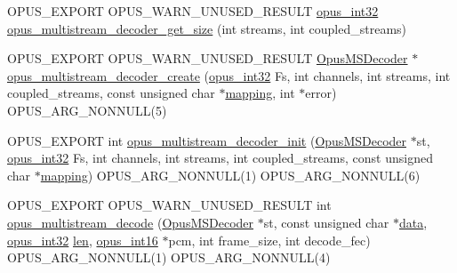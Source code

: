 \begin{DoxyCompactItemize}
\item 
O\+P\+U\+S\+\_\+\+E\+X\+P\+O\+RT O\+P\+U\+S\+\_\+\+W\+A\+R\+N\+\_\+\+U\+N\+U\+S\+E\+D\+\_\+\+R\+E\+S\+U\+LT \mbox{\hyperlink{opus__types_8h_aa4d309d6f80b99dbabebc8f98879ab9a}{opus\+\_\+int32}} \mbox{\hyperlink{group__opus__multistream_gad4e534e2ee78039fff01cd0c6f7c1dd1}{opus\+\_\+multistream\+\_\+decoder\+\_\+get\+\_\+size}} (int streams, int coupled\+\_\+streams)
\item 
O\+P\+U\+S\+\_\+\+E\+X\+P\+O\+RT O\+P\+U\+S\+\_\+\+W\+A\+R\+N\+\_\+\+U\+N\+U\+S\+E\+D\+\_\+\+R\+E\+S\+U\+LT \mbox{\hyperlink{group__opus__multistream_gad3497495deb9a8ace82e76cd4f93e0e4}{Opus\+M\+S\+Decoder}} $\ast$ \mbox{\hyperlink{group__opus__multistream_ga0dc5378a3d4c65498cf530e450b56aa1}{opus\+\_\+multistream\+\_\+decoder\+\_\+create}} (\mbox{\hyperlink{opus__types_8h_aa4d309d6f80b99dbabebc8f98879ab9a}{opus\+\_\+int32}} Fs, int channels, int streams, int coupled\+\_\+streams, const unsigned char $\ast$\mbox{\hyperlink{_s_d_l__opengl__glext_8h_aa4f194e5160ccbb5a8e83ab6ef4676d2}{mapping}}, int $\ast$error) O\+P\+U\+S\+\_\+\+A\+R\+G\+\_\+\+N\+O\+N\+N\+U\+LL(5)
\item 
O\+P\+U\+S\+\_\+\+E\+X\+P\+O\+RT int \mbox{\hyperlink{group__opus__multistream_gac9680d4205a5ea95785e747f0d2e393b}{opus\+\_\+multistream\+\_\+decoder\+\_\+init}} (\mbox{\hyperlink{group__opus__multistream_gad3497495deb9a8ace82e76cd4f93e0e4}{Opus\+M\+S\+Decoder}} $\ast$st, \mbox{\hyperlink{opus__types_8h_aa4d309d6f80b99dbabebc8f98879ab9a}{opus\+\_\+int32}} Fs, int channels, int streams, int coupled\+\_\+streams, const unsigned char $\ast$\mbox{\hyperlink{_s_d_l__opengl__glext_8h_aa4f194e5160ccbb5a8e83ab6ef4676d2}{mapping}}) O\+P\+U\+S\+\_\+\+A\+R\+G\+\_\+\+N\+O\+N\+N\+U\+LL(1) O\+P\+U\+S\+\_\+\+A\+R\+G\+\_\+\+N\+O\+N\+N\+U\+LL(6)
\item 
O\+P\+U\+S\+\_\+\+E\+X\+P\+O\+RT O\+P\+U\+S\+\_\+\+W\+A\+R\+N\+\_\+\+U\+N\+U\+S\+E\+D\+\_\+\+R\+E\+S\+U\+LT int \mbox{\hyperlink{group__opus__multistream_ga2db65790cd7e0890a031b2eb17452d7b}{opus\+\_\+multistream\+\_\+decode}} (\mbox{\hyperlink{group__opus__multistream_gad3497495deb9a8ace82e76cd4f93e0e4}{Opus\+M\+S\+Decoder}} $\ast$st, const unsigned char $\ast$\mbox{\hyperlink{_s_d_l__opengl_8h_a2e335d56e2846b0fea47eed068b2d34a}{data}}, \mbox{\hyperlink{opus__types_8h_aa4d309d6f80b99dbabebc8f98879ab9a}{opus\+\_\+int32}} \mbox{\hyperlink{_s_d_l__opengl__glext_8h_a652168017ea9a8bbcead03d5c16269fb}{len}}, \mbox{\hyperlink{opus__types_8h_acc9ed7cf60479eb81f9648c6ec27dc26}{opus\+\_\+int16}} $\ast$pcm, int frame\+\_\+size, int decode\+\_\+fec) O\+P\+U\+S\+\_\+\+A\+R\+G\+\_\+\+N\+O\+N\+N\+U\+LL(1) O\+P\+U\+S\+\_\+\+A\+R\+G\+\_\+\+N\+O\+N\+N\+U\+LL(4)

\end{DoxyCompactItemize}
